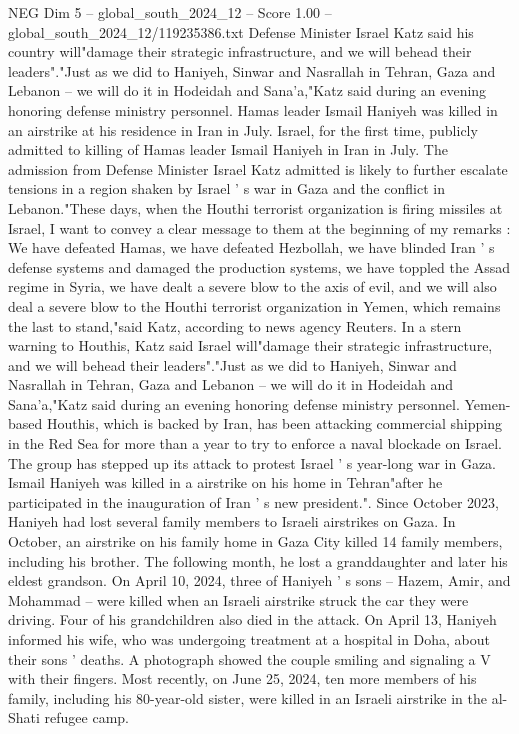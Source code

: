 \begin{textsample}{NEG Dim 5 – global\_south\_2024\_12 – Score 1.00 – global\_south\_2024\_12/119235386.txt}  \label{ex:f5_neg_408}
Defense Minister Israel Katz said his country will"damage their strategic infrastructure, and we will behead their leaders"."Just as we did to Haniyeh, Sinwar and Nasrallah in Tehran, Gaza and Lebanon -- we will do it in Hodeidah and Sana'a,"Katz said during an evening honoring defense ministry personnel.
Hamas leader Ismail Haniyeh was killed in an airstrike at his residence in Iran in July.
Israel, for the first time, publicly admitted to killing of Hamas leader Ismail Haniyeh in Iran in July.
The admission from Defense Minister Israel Katz admitted is likely to further escalate tensions in a region shaken by Israel ' s war in Gaza and the conflict in Lebanon."These days, when the Houthi terrorist organization is firing missiles at Israel, I want to convey a clear message to them at the beginning of my remarks : We have defeated Hamas, we have defeated Hezbollah, we have blinded Iran ' s defense systems and damaged the production systems, we have toppled the Assad regime in Syria, we have dealt a severe blow to the axis of evil, and we will also deal a severe blow to the Houthi terrorist organization in Yemen, which remains the last to stand,"said Katz, according to news agency Reuters.
In a stern warning to Houthis, Katz said Israel will"damage their strategic infrastructure, and we will behead their leaders"."Just as we did to Haniyeh, Sinwar and Nasrallah in Tehran, Gaza and Lebanon -- we will do it in Hodeidah and Sana'a,"Katz said during an evening honoring defense ministry personnel.
Yemen-based Houthis, which is backed by Iran, has been attacking commercial shipping in the Red Sea for more than a year to try to enforce a naval blockade on Israel.
The group has stepped up its attack to protest Israel ' s year-long war in Gaza.
Ismail Haniyeh was killed in a airstrike on his home in Tehran"after he participated in the inauguration of Iran ' s new president.".
Since October 2023, Haniyeh had lost several family members to Israeli airstrikes on Gaza.
In October, an airstrike on his family home in Gaza City killed 14 family members, including his brother.
The following month, he lost a granddaughter and later his eldest grandson.
On April 10, 2024, three of Haniyeh ' s sons -- Hazem, Amir, and Mohammad -- were killed when an Israeli airstrike struck the car they were driving.
Four of his grandchildren also died in the attack.
On April 13, Haniyeh informed his wife, who was undergoing treatment at a hospital in Doha, about their sons ' deaths.
A photograph showed the couple smiling and signaling a V with their fingers.
Most recently, on June 25, 2024, ten more members of his family, including his 80-year-old sister, were killed in an Israeli airstrike in the al-Shati refugee camp.

\end{textsample}

